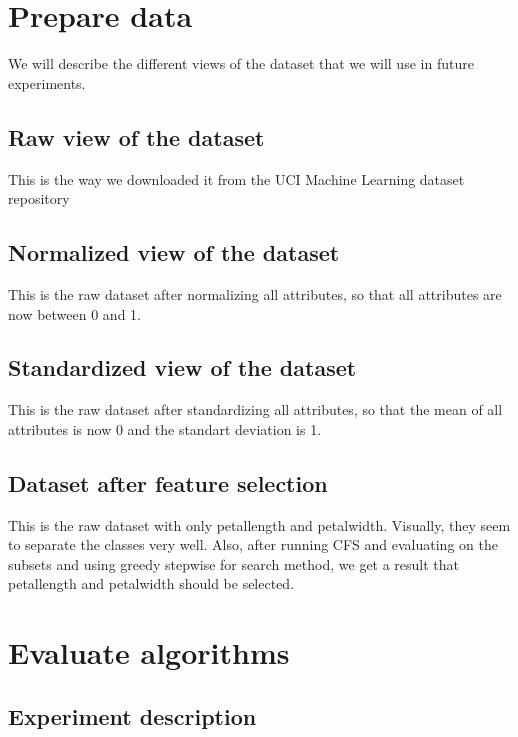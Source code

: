 \chapter{Prepare data}
We will describe the different views of the dataset that we will use in future experiments.
\section{Raw view of the dataset}
This is the way we downloaded it from the UCI Machine Learning dataset repository
\section{Normalized view of the dataset}
This is the raw dataset after normalizing all attributes, so that all attributes are now between 0 and 1.
\section{Standardized view of the dataset}
This is the raw dataset after standardizing all attributes, so that the mean of all attributes is now 0 and the standart deviation is 1.
\section{Dataset after feature selection}
This is the raw dataset with only petallength and petalwidth. Visually, they seem to separate the classes very well. Also, after running CFS and evaluating on the subsets and using greedy stepwise for search method, we get a result that petallength and petalwidth should be selected.

\chapter{Evaluate algorithms}
\section{Experiment description}

